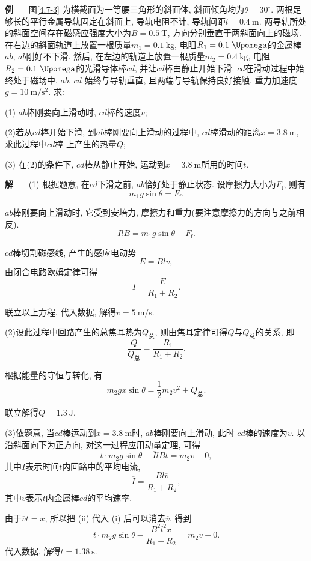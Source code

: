 \documentclass[11pt,a4paper]{ctexbook}
\newcounter{exam}[chapter]
\newcommand{\bre}{\ \ \ }
\newcommand{\examlabel}{\textbf{例\theexam}}
\newcommand{\soln}{\textbf{解}\bre}
\newcommand{\unit}[1]{\ \mathrm{#1}}
\newenvironment{example}{\bigskip\par\refstepcounter{exam}\examlabel\bre}{\par}
\newenvironment{solution}{\par\soln}{\par\bigskip}
\begin{document}
\begin{example}
    \label{斜面体题}
    图\ref{4.7-3} 为横截面为一等腰三角形的斜面体, 斜面倾角均为$\theta = 30^{\circ}$.
    两根足够长的平行金属导轨固定在斜面上, 导轨电阻不计, 导轨间距$l = 0.4\unit{m}$.
    两导轨所处的斜面空间存在磁感应强度大小为$B = 0.5\unit{T}$, 方向分别垂直于两斜面向上的磁场.
    在右边的斜面轨道上放置一根质量$m_1 = 0.1\unit{kg}$, 电阻$R_1 = 0.1\unit{\Upomega}$的金属棒$ab$,
    $ab$刚好不下滑. 然后, 在左边的轨道上放置一根质量$m_2 = 0.4\unit{kg}$,
    电阻$R_2 = 0.1\unit{\Upomega}$的光滑导体棒$cd$, 并让$cd$棒由静止开始下滑.
    $cd$在滑动过程中始终处于磁场中, $ab$, $cd$ 始终与导轨垂直, 且两端与导轨保持良好接触.
    重力加速度$g = 10\unit{m/s^2}$. 求:

    (1) $ab$棒刚要向上滑动时, $cd$棒的速度$v$;

    (2)若从$cd$棒开始下滑, 到$ab$棒刚要向上滑动的过程中, $cd$棒滑动的距离$x = 3.8\unit{m}$, 求此过程中$cd$棒
    上产生的热量$Q$;

    (3) 在(2)的条件下, $cd$棒从静止开始, 运动到$x = 3.8\unit{m}$所用的时间$t$.
\end{example}
\begin{solution}
    (1) 根据题意, 在$cd$下滑之前, $ab$恰好处于静止状态. 设摩擦力大小为$F_\text{f}$, 则有
    $$m_1g\sin \theta = F_\text{f}.$$

    $ab$棒刚要向上滑动时, 它受到安培力, 摩擦力和重力(要注意摩擦力的方向与之前相反).
    $$IlB = m_1g\sin \theta + F_\text{f}.$$

    $cd$棒切割磁感线, 产生的感应电动势$$E = Blv,$$
    由闭合电路欧姆定律可得$$I = \frac{E}{R_1 + R_2}.$$

    联立以上方程, 代入数据, 解得$v = 5\unit{m/s}.$

    (2)设此过程中回路产生的总焦耳热为$Q_\text{总}$,
    则由焦耳定律可得$Q$与$Q_\text{总}$的关系, 即
    $$\frac{Q}{Q_\text{总}} = \frac{R_1}{R_1+R_2}.$$

    根据能量的守恒与转化, 有$$m_2gx\sin\theta = \frac12m_2v^2+Q_\text{总}.$$

    联立解得$Q = 1.3\unit{J}.$

    (3)依题意, 当$cd$棒运动到$x = 3.8\unit{m}$时, $ab$棒刚要向上滑动, 此时
    $cd$棒的速度为$v$. 以沿斜面向下为正方向, 对这一过程应用动量定理, 可得
    \begin{equation*}
        t\cdot m_2g\sin\theta - \overline{I}lBt = m_2v - 0, \tag{i}
    \end{equation*}
    其中$\overline{I}$表示时间$t$内回路中的平均电流,
    \begin{equation*}
        \overline{I} = \frac{Bl\overline{v}}{R_1+R_2}, \tag{ii}
    \end{equation*}
    其中$\overline{v}$表示$t$内金属棒$cd$的平均速率.

    由于$\overline{v}t = x$, 所以把 (ii) 代入 (i) 后可以消去$\overline{v}$, 得到
    \begin{equation*}
        t\cdot m_2g\sin\theta - \frac{B^2l^2x}{R_1+R_2} = m_2v - 0.
    \end{equation*}
    代入数据, 解得$t = 1.38\unit{s}.$
\end{solution}
\end{document}
